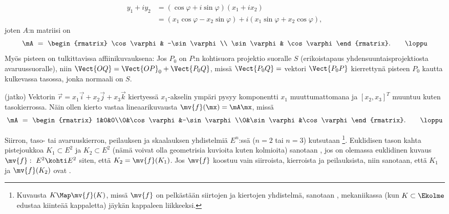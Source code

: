 \begin{align*}
 y_1 + i y_2 &= (\cos\varphi + i \sin\varphi)(x_1 + i x_2) \\ 
             &= (x_1\cos\varphi - x_2\sin\varphi) + i(x_1\sin\varphi + x_2\cos\varphi),
\end{align*}
joten $A$:n matriisi on
\[ 
\mA\ =\ \begin{rmatrix} 
        \cos\varphi & -\sin\varphi \\ \sin\varphi & \cos\varphi 
        \end{rmatrix}. \qquad \loppu 
\]
%
Myös pisteen  on tulkittavissa affiinikuvauksena: Jos $P_0$ on
$P$:n kohtisuora projektio suoralle $S$ (erikoistapaus yhdensuuntaisprojektiosta 
avaruussuoralle), niin $\Vect{OQ} = \Vect{OP}_0 + \Vect{P_0 Q}$, missä $\Vect{P_0 Q} =$ vektori
$\Vect{P_0 P}$ kierrettynä pisteen $P_0$ kautta kulkevassa tasossa, jonka normaali on $S$. 
\jatko \begin{Exa} (jatko) Vektorin $\vec{r} = x_1 \vec{i} + x_2 \vec{j} + x_3 \vec{k}$ 
kiertyessä $x_1$-akselin ympäri pysyy komponentti  $x_1$ muuttumattomana ja $[x_2,x_3]^T$
muuntuu kuten tasokierrossa. Näin ollen kierto vastaa lineaarikuvausta 
$\mv{f}(\mx) = \mA\mx$, missä
\[ 
\mA\ =\ \begin{rmatrix} 
         1&0&0\\0&\cos\varphi&-\sin\varphi\\0&\sin\varphi&\cos\varphi 
         \end{rmatrix}. \qquad \loppu 
\] 
\end{Exa}

Siirron, taso- tai avaruuskierron, peilauksen ja skaalauksen yhdistelmiä $E^n$:ssä 
($n=2$ tai $n=3$) kutsutaan
%
\footnote[2]{Kuvausta $K \Map \mv{f}(K)$, missä $\mv{f}$ on
pelkästään siirtojen ja kiertojen yhdistelmä, sanotaan ,
mekaniikassa (kun $K \subset \Ekolme$ edustaa kiinteää kappaletta) jäykän kappaleen
liikkeeksi. }. Euklidisen tason kahta pistejoukkoa
$K_1 \subset E^2$ ja $K_2 \subset E^2$ (nämä voivat olla geometrisia kuvioita kuten kolmioita)
%
sanotaan , jos on olemassa euklidinen kuvaus $\mv{f}:\ E^2 \kohti E^2$
siten, että $K_2 = \mv{f}(K_1)$. Jos $\mv{f}$ koostuu vain siirroista, kierroista ja
peilauksista, niin sanotaan, että $K_1$ ja $\mv{f}(K_2)$ ovat
%
.

